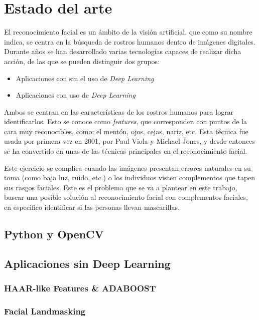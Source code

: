 
\chapter{Estado del arte}

El reconocimiento facial es un ámbito de la visión artificial, que como su nombre indica, se centra en la búsqueda de rostros humanos dentro de imágenes digitales. Durante años se han desarrollado varias tecnologías capaces de realizar dicha acción, de las que se pueden distinguir dos grupos:

\begin{itemize}
	\item Aplicaciones con sin el uso de \textit{Deep Learning}
	\item Aplicaciones con uso de \textit{Deep Learning}
\end{itemize}

Ambos se centran en las características de los rostros humanos para lograr identificarlos. Esto se conoce como \textit{features}, que corresponden con puntos de la cara muy reconocibles, como: el mentón, ojos, cejas, nariz, etc. Esta técnica fue usada por primera vez en 2001, por Paul Viola y Michael Jones, y desde entonces se ha convertido en unas de las técnicas principales en el reconocimiento facial.

Este ejercicio se complica cuando las imágenes presentan errores naturales en su toma (como baja luz, ruido, etc.) o los individuos visten complementos que tapen sus rasgos faciales. Este es el problema que se va a plantear en este trabajo, buscar una posible solución al reconocimiento facial con complementos faciales, en especifico identificar si las personas llevan mascarillas.

\section{Python y OpenCV}


\section{Aplicaciones sin Deep Learning}


\subsection*{HAAR-like Features \& ADABOOST}


\subsection*{Facial Landmasking}

